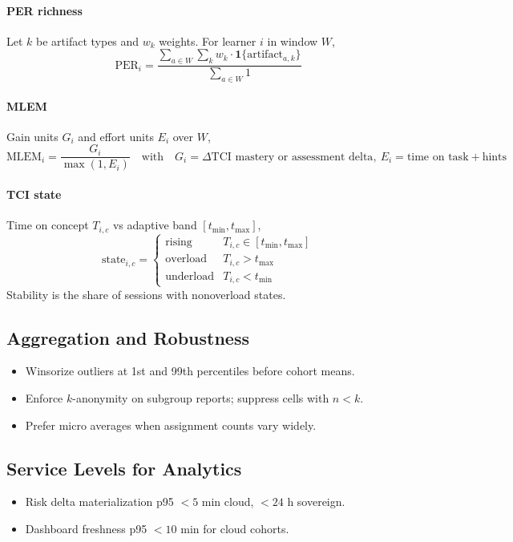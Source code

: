 \documentclass[11pt]{article}
\theoremstyle{plain}
\begin{document}
\paragraph{PER richness}
Let $k$ be artifact types and $w_k$ weights. For learner $i$ in window $W$,
\[
\text{PER}_{i}=\frac{\sum_{a\in W}\sum_{k} w_k \cdot \mathbf{1}\{\text{artifact}_{a,k}\}}{\sum_{a\in W}1}
\]

\paragraph{MLEM}
Gain units $G_i$ and effort units $E_i$ over $W$,
\[
\text{MLEM}_{i}=\frac{G_i}{\max(1,E_i)}\quad\text{with}\quad G_i=\Delta \text{TCI mastery or assessment delta},\ E_i=\text{time on task}+\text{hints}
\]

\paragraph{TCI state}
Time on concept $T_{i,c}$ vs adaptive band $[t_{\min},t_{\max}]$,
\[
\text{state}_{i,c}=\begin{cases}
\text{rising} & T_{i,c}\in[t_{\min},t_{\max}] \\
\text{overload} & T_{i,c}>t_{\max} \\
\text{underload} & T_{i,c}<t_{\min}
\end{cases}
\]
Stability is the share of sessions with nonoverload states.

\subsection{Aggregation and Robustness}
\begin{itemize}
  \item Winsorize outliers at 1st and 99th percentiles before cohort means.
  \item Enforce $k$-anonymity on subgroup reports; suppress cells with $n<k$.
  \item Prefer micro averages when assignment counts vary widely.
\end{itemize}

\subsection{Service Levels for Analytics}
\begin{itemize}
  \item Risk delta materialization p95 $<5$ min cloud, $<24$ h sovereign.
  \item Dashboard freshness p95 $<10$ min for cloud cohorts.
\end{itemize}
\end{document}
